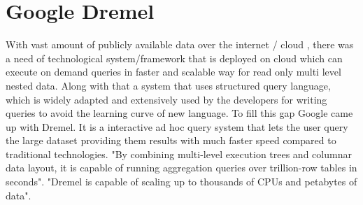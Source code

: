 \section{Google Dremel}

With vast amount of publicly available data over the internet / cloud , there was a need of technological system/framework 
that is deployed on cloud which can execute on demand queries in faster and scalable way for read only multi level nested 
data. Along with that a system that uses structured query language, which is widely adapted and extensively used by the 
developers for writing queries to avoid the learning curve of new language. To fill this gap Google came up with Dremel. 
It is a interactive ad hoc query system that lets the user query the large dataset providing them results with much faster 
speed compared to traditional technologies\cite{www-dremel}. "By combining multi-level execution trees and columnar data layout, 
it is capable of running aggregation queries over trillion-row tables in seconds"\cite{www-dremel}. "Dremel is capable of 
scaling up to thousands of CPUs and petabytes of data"\cite{www-dremel}.
